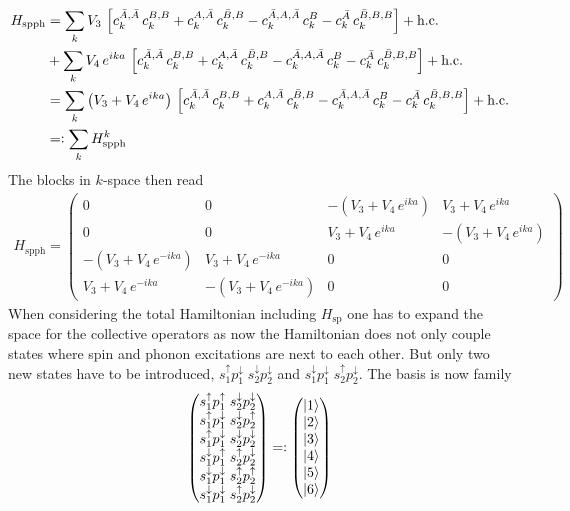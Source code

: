 \begin{align*}
    H_\text{spph}&= \sum_k V_3\,\left[ c_k^{\bar{A},\bar{A}}\,c_k^{B,B} + c_k^{A,\bar{A}}\,c_k^{\bar{B},B} - c_k^{\bar{A},A,\bar{A}}\,c_k^{B} - c_k^{\bar{A}}\,c_k^{\bar{B},B,B}\right] +\text{h.c.}\\
    &+ \sum_k V_4\,e^{ika}\,\left[ c_k^{\bar{A},\bar{A}}\,c_k^{B,B} + c_k^{A,\bar{A}}\,c_k^{\bar{B},B} - c_k^{\bar{A},A,\bar{A}}\,c_k^{B} - c_k^{\bar{A}}\,c_k^{\bar{B},B,B}\right] +\text{h.c.}\\
    &= \sum_k \left(V_3+V_4\,e^{ika}\right)\,\left[ c_k^{\bar{A},\bar{A}}\,c_k^{B,B} + c_k^{A,\bar{A}}\,c_k^{\bar{B},B} - c_k^{\bar{A},A,\bar{A}}\,c_k^{B} - c_k^{\bar{A}}\,c_k^{\bar{B},B,B}\right] +\text{h.c.}\\
    &=\vcentcolon \sum_k H_\text{spph}^k
\end{align*}
The blocks in $k$-space then read
\begin{align*}
    H_\text{spph}= \begin{pmatrix}
        0 & 0 & -(V_3+V_4\,e^{ika}) & V_3+V_4\,e^{ika}\\
        0 & 0 & V_3+V_4\,e^{ika} & -(V_3+V_4\,e^{ika})\\
        -(V_3+V_4\,e^{-ika}) & V_3+V_4\,e^{-ika} & 0 & 0 \\
       V_3+V_4\,e^{-ika} & -(V_3+V_4\,e^{-ika}) & 0 & 0         
    \end{pmatrix}
\end{align*}
When considering the total Hamiltonian including $H_\text{sp}$ one has to expand the space for the collective operators as now the Hamiltonian does not only couple states where spin and phonon excitations are next to each other. But only two new states have to be introduced, $s_1^\uparrow p_1^\downarrow \; s_2^\downarrow p_2^\downarrow$ and $s_1^\downarrow p_1^\downarrow\; s_2^\uparrow p_2^\downarrow$. The basis is now family
\begin{align*}
    \begin{pmatrix}
        s_1^\uparrow p_1^\uparrow \; s_2^\downarrow p_2^\downarrow\\
        s_1^\uparrow p_1^\downarrow\; s_2^\downarrow p_2^\uparrow\\
        s_1^\uparrow p_1^\downarrow \; s_2^\downarrow p_2^\downarrow\\
        s_1^\downarrow p_1^\uparrow\; s_2^\uparrow p_2^\downarrow\\
        s_1^\downarrow p_1^\downarrow\; s_2^\uparrow p_2^\uparrow\\
        s_1^\downarrow p_1^\downarrow\; s_2^\uparrow p_2^\downarrow
    \end{pmatrix}=\vcentcolon \begin{pmatrix}
        \ket{1}\\
        \ket{2}\\
        \ket{3}\\
        \ket{4}\\
        \ket{5}\\
        \ket{6}
    \end{pmatrix}
\end{align*}
